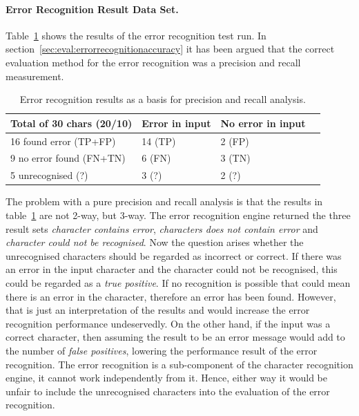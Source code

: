 \paragraph{Error Recognition Result Data Set.}
Table~\ref{table:eval:resultsprecisionandrecallnumbers} shows the results 
of the error recognition test run. 
In section~\ref{sec:eval:errorrecognitionaccuracy} it has been argued that the
correct evaluation method for the error recognition was a precision and recall
measurement.
\begin{table}[htbp]
\begin{center}
  \begin{tabular}{|l|l|l|p{200pt}|}
    \hline
    Total of 30 chars (20/10) & Error in input      & No error in input \\
    \hline
    16 found error (TP+FP)    & 14 (TP)             & 2 (FP) \\
    \hline
    9 no error found (FN+TN)  & 6 (FN)              & 3 (TN) \\
    \hline
    5 unrecognised (?)        & 3 (?)               & 2 (?) \\
    \hline
  \end{tabular}
\end{center}
\caption{Error recognition results as a basis for precision and recall analysis.}
\label{table:eval:resultsprecisionandrecallnumbers}
\end{table}
The problem with a pure precision and recall analysis is that the results
in table~\ref{table:eval:resultsprecisionandrecallnumbers} are not 2-way, 
but 3-way. The error recognition engine returned the three result sets 
\emph{character contains error}, \emph{characters does not contain error}
and \emph{character could not be recognised}.
Now the question arises whether the unrecognised characters should be 
regarded as incorrect or correct. 
If there was an error in the input character and the character could 
not be recognised, this could be regarded as a \emph{true positive}.
If no recognition is possible that could mean there is an error in 
the character, therefore an error has been found.
However, that is just an interpretation of the results and
would increase the error recognition performance undeservedly. 
On the other hand, if the input was a correct character,
then assuming the result to be an error message would add 
to the number of \emph{false positives}, 
lowering the performance result of the error recognition.
The error recognition is a sub-component of the character recognition engine,
it cannot work independently from it. 
Hence, either way it would be unfair to include the unrecognised
characters into the evaluation of the error recognition.

